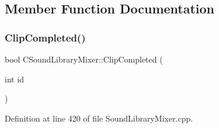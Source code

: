 \subsection{Member Function Documentation}
\hypertarget{classCSoundLibraryMixer_acd11bc59b6f11b1a8e1f0e821f0b8207}{}\label{classCSoundLibraryMixer_acd11bc59b6f11b1a8e1f0e821f0b8207} 
\subsubsection{\texorpdfstring{Clip\+Completed()}{ClipCompleted()}}
{\footnotesize\ttfamily bool C\+Sound\+Library\+Mixer\+::\+Clip\+Completed (\begin{DoxyParamCaption}\item[{int}]{id }\end{DoxyParamCaption})}



Definition at line 420 of file Sound\+Library\+Mixer.\+cpp.


